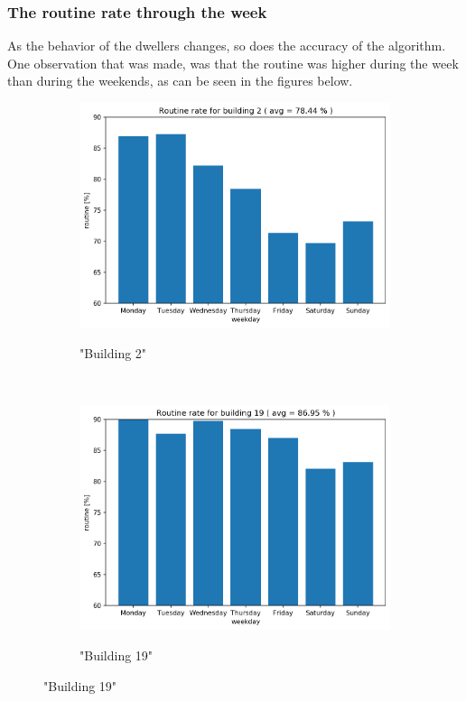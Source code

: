 \subsubsection{The routine rate through the week} \label{sssec:ratio_week}

As the behavior of the dwellers changes, so does the accuracy of the algorithm. 
One observation that was made, was that the routine was higher during the week than during the weekends,
as can be seen in the figures below. 

\begin{figure}[H]
	\begin{subfigure}{.5\textwidth}
		\caption{"Building 2"}
		\includegraphics[width=1\linewidth]{../Figures/EC/b2week.png}
		\label{fig:ec_b2week}
	\end{subfigure}%
	~ 
	\begin{subfigure}{.5\textwidth}
		\caption{"Building 19"}
		\includegraphics[width=1\linewidth]{../Figures/EC/b19week.png}
		\label{fig:ec_b5week}
	\end{subfigure}%
    \bigskip


\end{figure}
